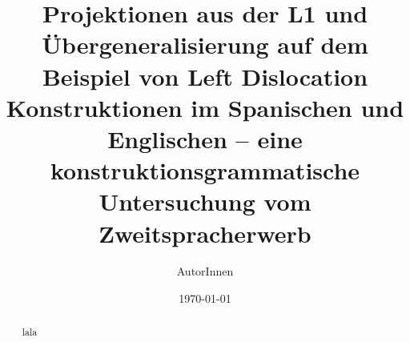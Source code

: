 \documentclass{scrartcl}
\title{Projektionen aus der L1 und Übergeneralisierung auf dem Beispiel von Left Dislocation Konstruktionen im Spanischen und Englischen -- eine konstruktionsgrammatische Untersuchung vom Zweitspracherwerb}
\author{AutorInnen}
\date{\today}
\begin{document}
\maketitle

\begin{abstract}
    lala
\end{abstract}












\nocite{*}



\end{document}
